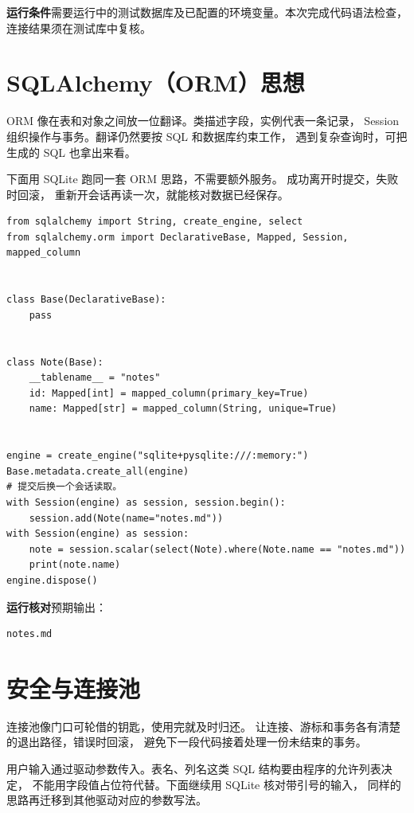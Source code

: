 \textbf{运行条件}\enspace 需要运行中的测试数据库及已配置的环境变量。本次完成代码语法检查，连接结果须在测试库中复核。


\section[SQLAlchemy思想]{SQLAlchemy（ORM）思想}

ORM 像在表和对象之间放一位翻译。类描述字段，实例代表一条记录，
Session 组织操作与事务。翻译仍然要按 SQL 和数据库约束工作，
遇到复杂查询时，可把生成的 SQL 也拿出来看。

下面用 SQLite 跑同一套 ORM 思路，不需要额外服务。
 成功离开时提交，失败时回滚，
重新开会话再读一次，就能核对数据已经保存。


\begin{lstlisting}[title={\code{orm_note.py}}]
from sqlalchemy import String, create_engine, select
from sqlalchemy.orm import DeclarativeBase, Mapped, Session, mapped_column


class Base(DeclarativeBase):
    pass


class Note(Base):
    __tablename__ = "notes"
    id: Mapped[int] = mapped_column(primary_key=True)
    name: Mapped[str] = mapped_column(String, unique=True)


engine = create_engine("sqlite+pysqlite:///:memory:")
Base.metadata.create_all(engine)
# 提交后换一个会话读取。
with Session(engine) as session, session.begin():
    session.add(Note(name="notes.md"))
with Session(engine) as session:
    note = session.scalar(select(Note).where(Note.name == "notes.md"))
    print(note.name)
engine.dispose()
\end{lstlisting}


\textbf{运行核对}\enspace 预期输出：
\begin{lstlisting}[language={},numbers=none]
notes.md
\end{lstlisting}

\par


\section{安全与连接池}

连接池像门口可轮借的钥匙，使用完就及时归还。
让连接、游标和事务各有清楚的退出路径，错误时回滚，
避免下一段代码接着处理一份未结束的事务。

用户输入通过驱动参数传入。表名、列名这类 SQL 结构要由程序的允许列表决定，
不能用字段值占位符代替。下面继续用 SQLite 核对带引号的输入，
同样的思路再迁移到其他驱动对应的参数写法。

